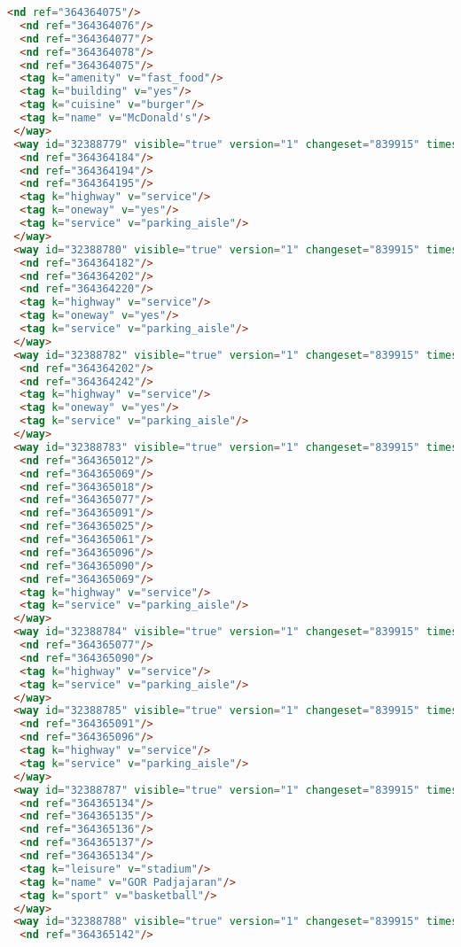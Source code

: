 \begin{lstlisting}[language=HTML,basicstyle=\tiny,caption=bandung1.xml]
  <nd ref="364364075"/>
  <nd ref="364364076"/>
  <nd ref="364364077"/>
  <nd ref="364364078"/>
  <nd ref="364364075"/>
  <tag k="amenity" v="fast_food"/>
  <tag k="building" v="yes"/>
  <tag k="cuisine" v="burger"/>
  <tag k="name" v="McDonald's"/>
 </way>
 <way id="32388779" visible="true" version="1" changeset="839915" timestamp="2009-03-21T14:15:19Z" user="adhitya" uid="7748">
  <nd ref="364364184"/>
  <nd ref="364364194"/>
  <nd ref="364364195"/>
  <tag k="highway" v="service"/>
  <tag k="oneway" v="yes"/>
  <tag k="service" v="parking_aisle"/>
 </way>
 <way id="32388780" visible="true" version="1" changeset="839915" timestamp="2009-03-21T14:15:20Z" user="adhitya" uid="7748">
  <nd ref="364364182"/>
  <nd ref="364364202"/>
  <nd ref="364364220"/>
  <tag k="highway" v="service"/>
  <tag k="oneway" v="yes"/>
  <tag k="service" v="parking_aisle"/>
 </way>
 <way id="32388782" visible="true" version="1" changeset="839915" timestamp="2009-03-21T14:15:21Z" user="adhitya" uid="7748">
  <nd ref="364364202"/>
  <nd ref="364364242"/>
  <tag k="highway" v="service"/>
  <tag k="oneway" v="yes"/>
  <tag k="service" v="parking_aisle"/>
 </way>
 <way id="32388783" visible="true" version="1" changeset="839915" timestamp="2009-03-21T14:15:26Z" user="adhitya" uid="7748">
  <nd ref="364365012"/>
  <nd ref="364365069"/>
  <nd ref="364365018"/>
  <nd ref="364365077"/>
  <nd ref="364365091"/>
  <nd ref="364365025"/>
  <nd ref="364365061"/>
  <nd ref="364365096"/>
  <nd ref="364365090"/>
  <nd ref="364365069"/>
  <tag k="highway" v="service"/>
  <tag k="service" v="parking_aisle"/>
 </way>
 <way id="32388784" visible="true" version="1" changeset="839915" timestamp="2009-03-21T14:15:27Z" user="adhitya" uid="7748">
  <nd ref="364365077"/>
  <nd ref="364365090"/>
  <tag k="highway" v="service"/>
  <tag k="service" v="parking_aisle"/>
 </way>
 <way id="32388785" visible="true" version="1" changeset="839915" timestamp="2009-03-21T14:15:29Z" user="adhitya" uid="7748">
  <nd ref="364365091"/>
  <nd ref="364365096"/>
  <tag k="highway" v="service"/>
  <tag k="service" v="parking_aisle"/>
 </way>
 <way id="32388787" visible="true" version="1" changeset="839915" timestamp="2009-03-21T14:15:30Z" user="adhitya" uid="7748">
  <nd ref="364365134"/>
  <nd ref="364365135"/>
  <nd ref="364365136"/>
  <nd ref="364365137"/>
  <nd ref="364365134"/>
  <tag k="leisure" v="stadium"/>
  <tag k="name" v="GOR Padjajaran"/>
  <tag k="sport" v="basketball"/>
 </way>
 <way id="32388788" visible="true" version="1" changeset="839915" timestamp="2009-03-21T14:15:38Z" user="adhitya" uid="7748">
  <nd ref="364365142"/>

\end{lstlisting}

